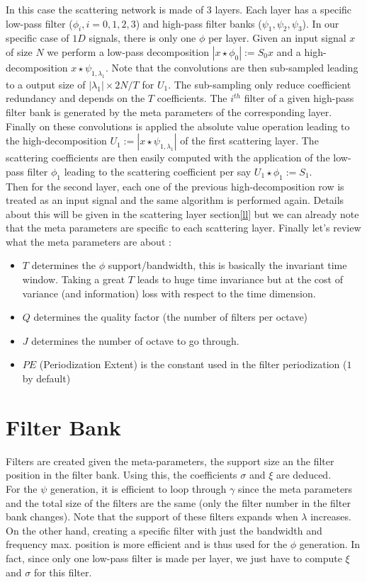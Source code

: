 \documentclass[a4paper]{report}
\begin{document}
In this case the scattering network is made of $3$ layers. Each layer has a specific low-pass filter ($\phi_i,i=0,1,2,3$) and high-pass filter banks ($\psi_1,\psi_2,\psi_3$). In our specific case of $1D$ signals, there is only one $\phi$ per layer. Given an input signal $x$ of size $N$ we perform a low-pass decomposition $|x \star \phi_0|:=S_0x$ and a high-decomposition $ x \star \psi_{1,\lambda_1}$. Note that the convolutions are then sub-sampled leading to a output size of $|\lambda_1| \times 2N/T$ for $U_1$. The sub-sampling only reduce coefficient redundancy and depends on the $T$ coefficients. The $i^{th}$ filter of a given high-pass filter bank is generated by the meta parameters of the corresponding layer.
\\Finally on these convolutions is applied the absolute value operation leading to the high-decomposition $U_1:=|x \star \psi_{1,\lambda_1}|$ of the first scattering layer. The scattering coefficients are then easily computed with the application of the low-pass filter $\phi_1$ leading to the scattering coefficient per say $U_1 \star \phi_1:=S_1$. 
\\
Then for the second layer, each one of the previous high-decomposition row is treated as an input signal and the same algorithm is performed again. Details about this will be given in the scattering layer section\ref{ll} but we can already note that the meta parameters are specific to each scattering layer.
Finally let's review what the meta parameters are about :
\begin{itemize}
\item $T$ determines the $\phi$ support/bandwidth, this is basically the invariant time window. Taking a great $T$ leads to huge time invariance but at the cost of variance (and information) loss with respect to the time dimension.
\item $Q$ determines the quality factor (the number of filters per octave)
\item $J$ determines the number of octave to go through.
\item $PE$ (Periodization Extent) is the constant used in the filter periodization ($1$ by default)
\end{itemize}

\section{Filter Bank}
Filters are created given the meta-parameters, the support size an the filter position in the filter bank. Using this, the coefficients $\sigma$ and $\xi$ are deduced.\\
For the $\psi$ generation, it is efficient to loop through $\gamma$ since the meta parameters and the total size of the filters are the same (only the filter number in the filter bank changes). Note that the support of these filters expands when $\lambda$ increases.
On the other hand, creating a specific filter with just the bandwidth and frequency max. position is more efficient and is thus used for the $\phi$ generation. In fact, since only one low-pass filter is made per layer, we just have to compute $\xi$ and $\sigma$ for this filter.
\end{document}
